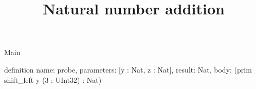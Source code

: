 \begin{lexlean}{Main}
\title{Natural number addition}
\begin{semanticmodule}
definition{
  name: probe,
  parameters: [y : Nat, z : Nat],
  result: Nat,
  body: (prim shift_left y (3 : UInt32) : Nat)
}
\end{semanticmodule}
\end{lexlean}
